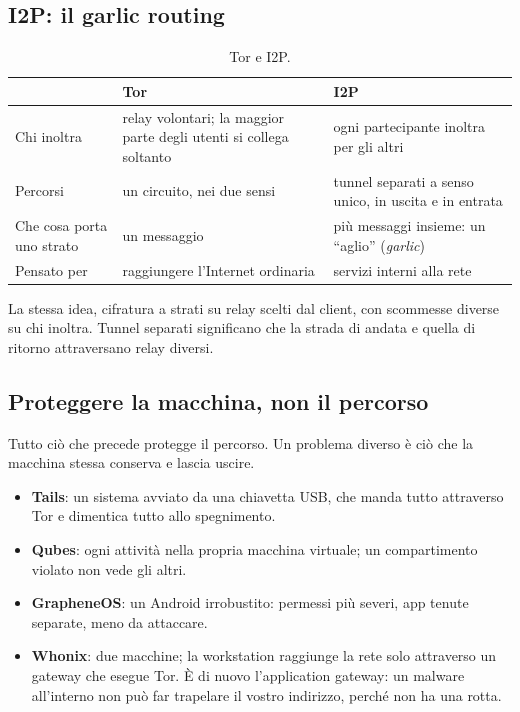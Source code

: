 \subsection{I2P: il garlic routing}

\begin{table}[H]
\centering
\begin{tabular}{p{3.2cm}p{6cm}p{6cm}}
\toprule
 & \textbf{Tor} & \textbf{I2P} \\
\midrule
Chi inoltra & relay volontari; la maggior parte degli utenti si collega soltanto & ogni partecipante inoltra per gli altri \\
Percorsi & un circuito, nei due sensi & tunnel separati a senso unico, in uscita e in entrata \\
Che cosa porta uno strato & un messaggio & più messaggi insieme: un ``aglio'' (\emph{garlic}) \\
Pensato per & raggiungere l'Internet ordinaria & servizi interni alla rete \\
\bottomrule
\end{tabular}
\caption{Tor e I2P.}
\end{table}

La stessa idea, cifratura a strati su relay scelti dal client, con scommesse diverse su chi inoltra. Tunnel separati significano che la
strada di andata e quella di ritorno attraversano relay diversi.

\subsection{Proteggere la macchina, non il percorso}

Tutto ciò che precede protegge il percorso. Un problema diverso è ciò che la macchina stessa conserva e lascia uscire.

\begin{itemize}
    \item \textbf{Tails}: un sistema avviato da una chiavetta USB, che manda tutto attraverso Tor e dimentica tutto allo spegnimento.
    \item \textbf{Qubes}: ogni attività nella propria macchina virtuale; un compartimento violato non vede gli altri.
    \item \textbf{GrapheneOS}: un Android irrobustito: permessi più severi, app tenute separate, meno da attaccare.
    \item \textbf{Whonix}: due macchine; la workstation raggiunge la rete solo attraverso un gateway che esegue Tor. È di nuovo
          l'application gateway: un malware all'interno non può far trapelare il vostro indirizzo, perché non ha una rotta.
\end{itemize}

